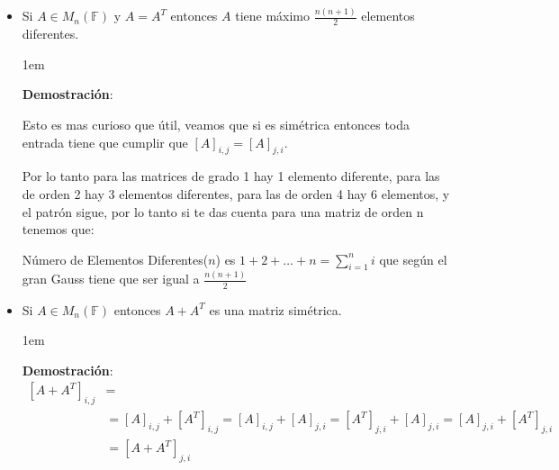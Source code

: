 \documentclass[12pt, fleqn]{report}                             %
\newenvironment{SmallIndentation}[1][0.75em]                    %
    {\begin{adjustwidth}{#1}{}\begin{footnotesize}}                 %
    {\end{footnotesize}\end{adjustwidth}}                           %
\begin{document}
                    \begin{itemize}

                        \item Si $A \in M_{n}(\mathbb{F})$ y $A = A^T$ entonces $A$ tiene máximo 
                            $\frac{n(n+1)}{2}$ elementos diferentes.

                            \begin{SmallIndentation}[1em]
                                \textbf{Demostración}:

                                Esto es mas curioso que útil, veamos que si es simétrica entonces toda
                                entrada tiene que cumplir que $[A]_{i, j} = [A]_{j,i}$.

                                Por lo tanto para las matrices de grado 1 hay 1 elemento diferente, 
                                para las de orden 2 hay 3 elementos diferentes, para las de orden 4 hay 6
                                elementos, y el patrón sigue, por lo tanto si te das cuenta para 
                                una matriz de orden n tenemos que:

                                Número de Elementos Diferentes($n$) es $1+2+\dots+n = \sum_{i=1}^{n} i$
                                que según el gran Gauss tiene que ser igual a $\frac{n(n+1)}{2}$


                            \end{SmallIndentation}

                        \item Si $A \in M_{n}(\mathbb{F})$ entonces $A+A^T$ es una matriz simétrica. 

                            \begin{SmallIndentation}[1em]
                                \textbf{Demostración}:
                                \begin{equation*}
                                \begin{split}
                                    [A+A^T]_{i,j}   &=                              \\
                                                    &=  [A]_{i,j} + [A^T]_{i,j}    
                                                     =  [A]_{i,j} + [A]_{j,i}    
                                                     =  [A^T]_{j,i} + [A]_{j,i}    
                                                     =  [A]_{j,i} + [A^T]_{j, i}    \\
                                                    &=  [A+A^T]_{j, i}             
                                \end{split}
                                \end{equation*}

                            \end{SmallIndentation}


                    \end{itemize}
\end{document}
